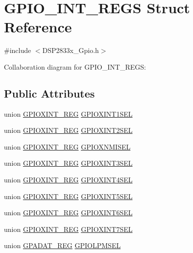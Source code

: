 \hypertarget{struct_g_p_i_o___i_n_t___r_e_g_s}{}\section{G\+P\+I\+O\+\_\+\+I\+N\+T\+\_\+\+R\+E\+G\+S Struct Reference}
\label{struct_g_p_i_o___i_n_t___r_e_g_s}


{\ttfamily \#include $<$D\+S\+P2833x\+\_\+\+Gpio.\+h$>$}



Collaboration diagram for G\+P\+I\+O\+\_\+\+I\+N\+T\+\_\+\+R\+E\+G\+S\+:
\subsection*{Public Attributes}
\begin{DoxyCompactItemize}
\item 
union \hyperlink{union_g_p_i_o_x_i_n_t___r_e_g}{G\+P\+I\+O\+X\+I\+N\+T\+\_\+\+R\+E\+G} \hyperlink{struct_g_p_i_o___i_n_t___r_e_g_s_a7160ca361c5037ee7f7d0264e0db210d}{G\+P\+I\+O\+X\+I\+N\+T1\+S\+E\+L}
\item 
union \hyperlink{union_g_p_i_o_x_i_n_t___r_e_g}{G\+P\+I\+O\+X\+I\+N\+T\+\_\+\+R\+E\+G} \hyperlink{struct_g_p_i_o___i_n_t___r_e_g_s_a07ece14fc658b96ef1c7f4247f0bd50b}{G\+P\+I\+O\+X\+I\+N\+T2\+S\+E\+L}
\item 
union \hyperlink{union_g_p_i_o_x_i_n_t___r_e_g}{G\+P\+I\+O\+X\+I\+N\+T\+\_\+\+R\+E\+G} \hyperlink{struct_g_p_i_o___i_n_t___r_e_g_s_aa7c7bbb9574a5a910c11d0170b3b029b}{G\+P\+I\+O\+X\+N\+M\+I\+S\+E\+L}
\item 
union \hyperlink{union_g_p_i_o_x_i_n_t___r_e_g}{G\+P\+I\+O\+X\+I\+N\+T\+\_\+\+R\+E\+G} \hyperlink{struct_g_p_i_o___i_n_t___r_e_g_s_a3968f7df5ef670ff333a6b9fbf1df8bd}{G\+P\+I\+O\+X\+I\+N\+T3\+S\+E\+L}
\item 
union \hyperlink{union_g_p_i_o_x_i_n_t___r_e_g}{G\+P\+I\+O\+X\+I\+N\+T\+\_\+\+R\+E\+G} \hyperlink{struct_g_p_i_o___i_n_t___r_e_g_s_acfa35b0c2b044b7cb574a09393b0060a}{G\+P\+I\+O\+X\+I\+N\+T4\+S\+E\+L}
\item 
union \hyperlink{union_g_p_i_o_x_i_n_t___r_e_g}{G\+P\+I\+O\+X\+I\+N\+T\+\_\+\+R\+E\+G} \hyperlink{struct_g_p_i_o___i_n_t___r_e_g_s_ad27530e36db813ae9eba9eec74895826}{G\+P\+I\+O\+X\+I\+N\+T5\+S\+E\+L}
\item 
union \hyperlink{union_g_p_i_o_x_i_n_t___r_e_g}{G\+P\+I\+O\+X\+I\+N\+T\+\_\+\+R\+E\+G} \hyperlink{struct_g_p_i_o___i_n_t___r_e_g_s_a3690647097e7286b4331d4796ce88677}{G\+P\+I\+O\+X\+I\+N\+T6\+S\+E\+L}
\item 
union \hyperlink{union_g_p_i_o_x_i_n_t___r_e_g}{G\+P\+I\+O\+X\+I\+N\+T\+\_\+\+R\+E\+G} \hyperlink{struct_g_p_i_o___i_n_t___r_e_g_s_ac31f0fb91f35ad7c03d188898e76cb0e}{G\+P\+I\+O\+X\+I\+N\+T7\+S\+E\+L}
\item 
union \hyperlink{union_g_p_a_d_a_t___r_e_g}{G\+P\+A\+D\+A\+T\+\_\+\+R\+E\+G} \hyperlink{struct_g_p_i_o___i_n_t___r_e_g_s_a0b444af67e75935725bc5b7a68171e0d}{G\+P\+I\+O\+L\+P\+M\+S\+E\+L}
\end{DoxyCompactItemize}


